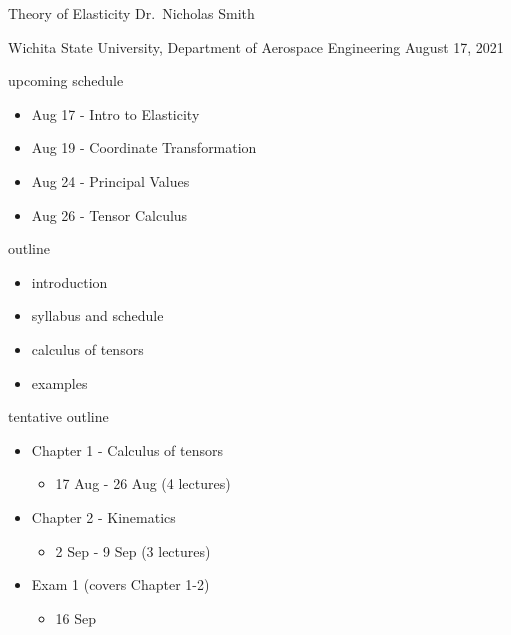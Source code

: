 \documentclass[
  letterpaper,
  ignorenonframetext,
  aspectratio=43,
  handout,
  12pt]{beamer}
\author{}
\date{}
\providecommand{\tightlist}{%
  \setlength{\itemsep}{0pt}\setlength{\parskip}{0pt}}
\providecommand{\tightlist}{%
\setlength{\itemsep}{0pt}\setlength{\parskip}{0pt}}
\begin{document}
\begin{frame}{Theory of Elasticity}
\protect\hypertarget{theory-of-elasticity}{}
Dr.~Nicholas Smith

Wichita State University, Department of Aerospace Engineering August 17,
2021
\end{frame}

\begin{frame}{upcoming schedule}
\protect\hypertarget{upcoming-schedule}{}
\begin{itemize}
\tightlist
\item
  Aug 17 - Intro to Elasticity
\item
  Aug 19 - Coordinate Transformation
\item
  Aug 24 - Principal Values
\item
  Aug 26 - Tensor Calculus
\end{itemize}
\end{frame}

\begin{frame}{outline}
\protect\hypertarget{outline}{}
\begin{itemize}
\tightlist
\item
  introduction
\item
  syllabus and schedule
\item
  calculus of tensors
\item
  examples
\end{itemize}
\end{frame}














\begin{frame}{tentative outline}
\protect\hypertarget{tentative-outline}{}
\begin{itemize}
\tightlist
\item
  Chapter 1 - Calculus of tensors

  \begin{itemize}
  \tightlist
  \item
    17 Aug - 26 Aug (4 lectures)
  \end{itemize}
\item
  Chapter 2 - Kinematics

  \begin{itemize}
  \tightlist
  \item
    2 Sep - 9 Sep (3 lectures)
  \end{itemize}
\item
  Exam 1 (covers Chapter 1-2)

  \begin{itemize}
  \tightlist
  \item
    16 Sep
  \end{itemize}
\end{itemize}
\end{frame}
\end{document}
